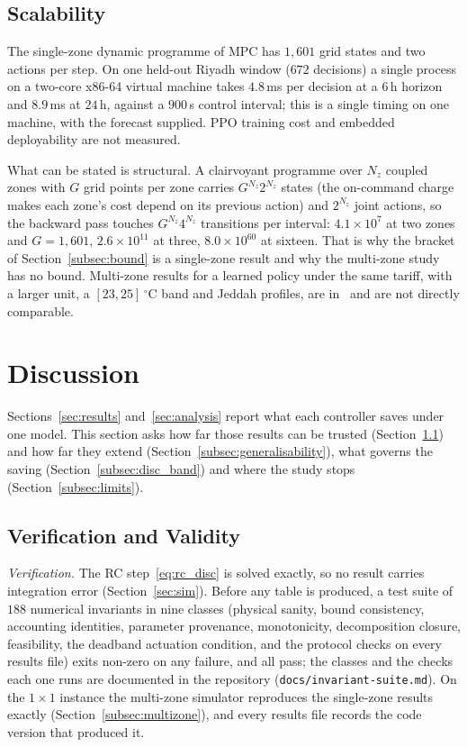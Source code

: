\documentclass[3p,twocolumn,number]{elsarticle}
\begin{document}
\subsection{Scalability}
\label{subsec:abl_cost}

The single-zone dynamic programme of MPC has $1{,}601$ grid states and two actions per step. On one held-out Riyadh window ($672$ decisions) a single process on a two-core x86-64 virtual machine takes $4.8\,$ms per decision at a $6\,$h horizon and $8.9\,$ms at $24\,$h, against a $900\,$s control interval; this is a single timing on one machine, with the forecast supplied. PPO training cost and embedded deployability are not measured.

What can be stated is structural. A clairvoyant programme over $N_z$ coupled zones with $G$ grid points per zone carries $G^{N_z}2^{N_z}$ states (the on-command charge makes each zone's cost depend on its previous action) and $2^{N_z}$ joint actions, so the backward pass touches $G^{N_z}4^{N_z}$ transitions per interval: $4.1\times10^{7}$ at two zones and $G=1{,}601$, $2.6\times10^{11}$ at three, $8.0\times10^{60}$ at sixteen. That is why the bracket of Section~\ref{subsec:bound} is a single-zone result and why the multi-zone study has no bound. Multi-zone results for a learned policy under the same tariff, with a larger unit, a $[23,25]\,^\circ$C band and Jeddah profiles, are in~\cite{Faraj2026} and are not directly comparable.

\section{Discussion}
\label{sec:discussion}

Sections~\ref{sec:results} and~\ref{sec:analysis} report what each controller saves under one model. This section asks how far those results can be trusted (Section~\ref{subsec:validity}) and how far they extend (Section~\ref{subsec:generalisability}), what governs the saving (Section~\ref{subsec:disc_band}) and where the study stops (Section~\ref{subsec:limits}).

\subsection{Verification and Validity}
\label{subsec:validity}

\emph{Verification.} The RC step~\eqref{eq:rc_disc} is solved exactly, so no result carries integration error (Section~\ref{sec:sim}). Before any table is produced, a test suite of $188$ numerical invariants in nine classes (physical sanity, bound consistency, accounting identities, parameter provenance, monotonicity, decomposition closure, feasibility, the deadband actuation condition, and the protocol checks on every results file) exits non-zero on any failure, and all pass; the classes and the checks each one runs are documented in the repository (\texttt{docs/invariant-suite.md}). On the $1\times1$ instance the multi-zone simulator reproduces the single-zone results exactly (Section~\ref{subsec:multizone}), and every results file records the code version that produced it.
\end{document}
